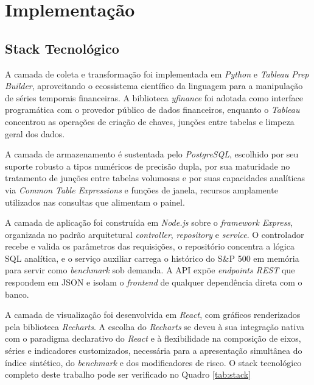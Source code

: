 \chapter{Implementação}
\label{implementacao}

\section{Stack Tecnológico}
\label{sec:stack-tecnologico}

A camada de coleta e transformação foi implementada em \textit{Python} e \textit{Tableau Prep Builder}, aproveitando o ecossistema científico da linguagem para a manipulação de séries temporais financeiras. A biblioteca \textit{yfinance} foi adotada como interface programática com o provedor público de dados financeiros, enquanto o \textit{Tableau} concentrou as operações de criação de chaves, junções entre tabelas e limpeza geral dos dados.

A camada de armazenamento é sustentada pelo \textit{PostgreSQL}, escolhido por seu suporte robusto a tipos numéricos de precisão dupla, por sua maturidade no tratamento de junções entre tabelas volumosas e por suas capacidades analíticas via \textit{Common Table Expressions} e funções de janela, recursos amplamente utilizados nas consultas que alimentam o painel.

A camada de aplicação foi construída em \textit{Node.js} sobre o \textit{framework Express}, organizada no padrão arquitetural \textit{controller}, \textit{repository} e \textit{service}. O controlador recebe e valida os parâmetros das requisições, o repositório concentra a lógica SQL analítica, e o serviço auxiliar carrega o histórico do S\&P 500 em memória para servir como \textit{benchmark} sob demanda. A API expõe \textit{endpoints REST} que respondem em JSON e isolam o \textit{frontend} de qualquer dependência direta com o banco.

A camada de visualização foi desenvolvida em \textit{React}, com gráficos renderizados pela biblioteca \textit{Recharts}. A escolha do \textit{Recharts} se deveu à sua integração nativa com o paradigma declarativo do \textit{React} e à flexibilidade na composição de eixos, séries e indicadores customizados, necessária para a apresentação simultânea do índice sintético, do \textit{benchmark} e dos modificadores de risco. O stack tecnológico completo deste trabalho pode ser verificado no Quadro \ref{tab:stack}

